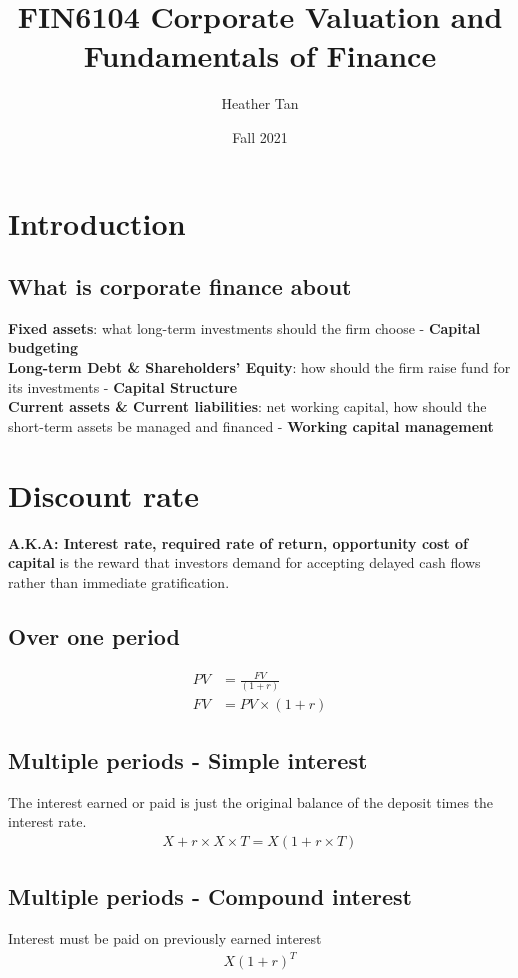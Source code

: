 \documentclass{article}
\title{FIN6104 Corporate Valuation and Fundamentals of Finance }
\author{Heather Tan}
\date{Fall 2021}
\theoremstyle{definition}
\theoremstyle{thrm}
\theoremstyle{lma}
\theoremstyle{ppst}
\theoremstyle{crlr}
\begin{document}
\maketitle	
\tableofcontents
\pagebreak

\section{Introduction}
\subsection{What is corporate finance about}
\textbf{Fixed assets}: what long-term investments should the firm choose - \textbf{Capital budgeting}\\
\textbf{Long-term Debt \& Shareholders' Equity}: how should the firm raise fund for its investments - \textbf{Capital Structure}\\
\textbf{Current assets \& Current liabilities}: net working capital, how should the short-term assets be managed and financed - \textbf{Working capital management}\\

\section{Discount rate}
\textbf{A.K.A: Interest rate, required rate of return, opportunity cost of capital} is the reward that investors demand for accepting delayed cash flows rather than immediate gratification.
\subsection{Over one period}
\begin{align*}
	PV &= \frac{FV}{(1+r)}\\
	FV &= PV \times (1+r)
\end{align*}
\subsection{Multiple periods - Simple interest}
The interest earned or paid is just the original balance of the deposit times the interest rate. 
\begin{align*}
	X + r\times X\times T = X(1+r\times T)
\end{align*}
\subsection{Multiple periods - Compound interest}
Interest must be paid on previously earned interest 
\begin{align*}
	X(1+r)^T
\end{align*}
\end{document}
